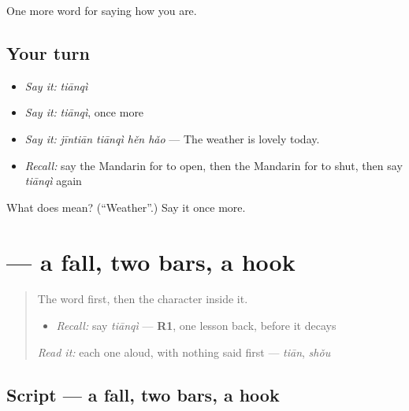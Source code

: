 \begin{grammarlens}[title={What you've built}]
One more word for saying how you are.
\end{grammarlens}

\subsection*{Your turn}
\begin{itemize}
\raggedright
  \item \emph{Say it:} \emph{tiānqì}
  \item \emph{Say it:} \emph{tiānqì}, once more
  \item \emph{Say it:} \emph{jīntiān tiānqì hěn hǎo} — The weather is lovely today.
  \item \emph{Recall:} say the Mandarin for to open, then the Mandarin for to shut, then say \emph{tiānqì} again
\end{itemize}

\begin{tcolorbox}[breakable,colback=teal!4,colframe=teal!35!black,title={Before you move on}]
What does  mean? (\textquotedblleft{}Weather\textquotedblright{}.) Say it once more.
\end{tcolorbox}
\section[\texorpdfstring{\zh{气} (qì)}{气 (qì)}]{ — a fall, two bars, a hook}

\label{lesson:ZH-W66-qi-air}



\begin{quote}
The word first, then the character inside it.

\begin{itemize}
\raggedright
  \item \emph{Recall:} say \emph{tiānqì} — \textbf{R1}, one lesson back, before it decays
\end{itemize}

\begin{quote}
 
\end{quote}

\emph{Read it:} each one aloud, with nothing said first — \emph{tiān}, \emph{shǒu}
\end{quote}

\subsection*{Script — a fall, two bars, a hook}

